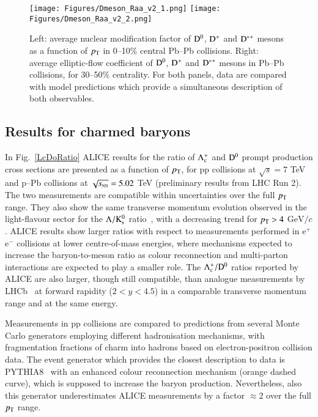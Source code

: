 \documentclass{webofc}
\newcommand{\sqrts}{\sqrt{s}}
\newcommand{\sqrtsNN}{\sqrt{s_{\rm \scriptscriptstyle NN}}}
\newcommand{\gevc}{\mathrm{GeV}/c}
\newcommand{\pt}{p_{\rm T}}
\newcommand{\Dzero}{{\rm D^0}}
\newcommand{\Dstar}{{\rm D^{*+}}}
\newcommand{\Dplus}{{\rm D^+}}
\newcommand{\Lc}{\Lambda^+_{\rm c}}
\begin{document}
\begin{figure}[h]
\centering %
\texttt{[image: Figures/Dmeson\_Raa\_v2\_1.png]}
\texttt{[image: Figures/Dmeson\_Raa\_v2\_2.png]}
\caption{Left: average nuclear modification factor of $\Dzero$, $\Dplus$ and $\Dstar$ mesons as a function of $\pt$ in 0--10\% central Pb--Pb collisions. Right: average elliptic-flow coefficient of $\Dzero$, $\Dplus$ and $\Dstar$ mesons in Pb--Pb collisions, for 30--50\% centrality. For both panels, data are compared with model predictions which provide a simultaneous description of both observables.}
\label{Dmeson_Raa}       %
\end{figure}

\subsection{Results for charmed baryons}
\label{sub2}
In Fig.~\ref{LcDoRatio} ALICE results for the ratio of $\Lc$ and $\Dzero$ prompt production cross sections are presented as a function of $\pt$, for pp collisions at $\sqrts = 7$ TeV~\cite{Acharya:2017kfy} and p--Pb collisions at $\sqrtsNN = 5.02$ TeV (preliminary results from LHC Run 2). The two measurements are compatible within uncertainties over the full $\pt$ range. They also show the same transverse momentum evolution observed in the light-flavour sector for the $\Lambda/{\rm K^0_{\rm s}}$ ratio~\cite{Abelev:2013xaa,Adam:2016dau}, with a decreasing trend for $\pt > 4$ $\gevc$.
ALICE results show larger ratios with respect to measurements performed in e$^+$e$^-$ collisions at lower centre-of-mass energies, where mechanisms expected to increase the baryon-to-meson ratio as colour reconnection and multi-parton interactions are expected to play a smaller role. The $\Lc/\Dzero$ ratios reported by ALICE are also larger, though still compatible, than analogue measurements by LHCb~\cite{Aaij:2018iyy} at forward rapidity ($2 < y < 4.5$) in a comparable transverse momentum range and at the same energy.

Measurements in pp collisions are compared to predictions from several Monte Carlo generators employing different hadronisation mechanisms, with fragmentation fractions of charm into hadrons based on electron-positron collision data. The event generator which provides the closest description to data is PYTHIA8~\cite{Sjostrand:2006za,Sjostrand:2007gs} with an enhanced colour reconnection mechanism (orange dashed curve), which is supposed to increase the baryon production. Nevertheless, also this generator underestimates ALICE measurements by a factor $\approx2$ over the full $\pt$ range.
\end{document}
